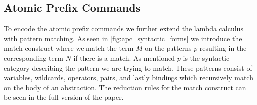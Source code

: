 \documentclass[sigplan,screen]{acmart}
\begin{document}
    

\subsection{Atomic Prefix Commands}
To encode the atomic prefix commands we further extend the lambda calculus with pattern matching. As seen in \cref{fig:apc_syntactic_forms} we introduce the match construct where we match the term $M$ on the patterns $p$ resulting in the corresponding term $N$ if there is a match. As mentioned $p$ is the syntactic category describing the pattern we are trying to match. These patterns consist of variables, wildcards, operators, pairs, and lastly bindings which recursively match on the body of an abstraction. 
The reduction rules for the match construct can be seen in the full version of the paper.
\end{document}
